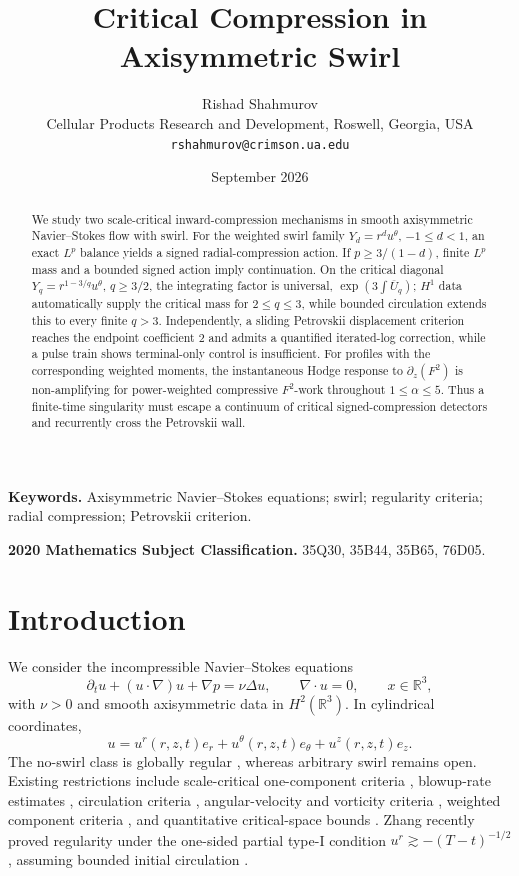 \documentclass[11pt]{article}
\title{\textbf{Critical Compression in Axisymmetric Swirl}}
\author{Rishad Shahmurov\\
Cellular Products Research and Development, Roswell, Georgia, USA\\
\texttt{rshahmurov@crimson.ua.edu}}
\date{September 2026}
\numberwithin{equation}{section}
\theoremstyle{definition}
\newcommand{\R}{\mathbb R}
\begin{document}
\maketitle

\begin{abstract}
We study two scale-critical inward-compression mechanisms in smooth axisymmetric Navier--Stokes flow with swirl.  For the weighted swirl family $Y_d=r^d u^\theta$, $-1\le d<1$, an exact $L^p$ balance yields a signed radial-compression action.  If $p\ge3/(1-d)$, finite $L^p$ mass and a bounded signed action imply continuation.  On the critical diagonal $Y_q=r^{1-3/q}u^\theta$, $q\ge3/2$, the integrating factor is universal, $\exp(3\int\overline U_q)$; $H^1$ data automatically supply the critical mass for $2\le q\le3$, while bounded circulation extends this to every finite $q>3$.  Independently, a sliding Petrovskii displacement criterion reaches the endpoint coefficient $2$ and admits a quantified iterated-log correction, while a pulse train shows terminal-only control is insufficient.  For profiles with the corresponding weighted moments, the instantaneous Hodge response to $\partial_z(F^2)$ is non-amplifying for power-weighted compressive $F^2$-work throughout $1\le\alpha\le5$.  Thus a finite-time singularity must escape a continuum of critical signed-compression detectors and recurrently cross the Petrovskii wall.
\end{abstract}

\noindent\textbf{Keywords.} Axisymmetric Navier--Stokes equations; swirl; regularity criteria; radial compression; Petrovskii criterion.

\noindent\textbf{2020 Mathematics Subject Classification.} 35Q30, 35B44, 35B65, 76D05.

\section{Introduction}

We consider the incompressible Navier--Stokes equations
\begin{equation}\label{eq:NS}
 \partial_t u+(u\cdot\nabla)u+\nabla p=\nu\Delta u,
 \qquad \nabla\cdot u=0,
 \qquad x\in\R^3,
\end{equation}
with $\nu>0$ and smooth axisymmetric data in $H^2(\R^3)$.  In cylindrical coordinates,
\[
 u=u^r(r,z,t)e_r+u^\theta(r,z,t)e_\theta+u^z(r,z,t)e_z.
\]
The no-swirl class is globally regular \cite{UkhovskiiYudovich1968,Ladyzhenskaya1968}, whereas arbitrary swirl remains open.  Existing restrictions include scale-critical one-component criteria \cite{ChaeLee2002}, blowup-rate estimates \cite{ChenStrainTsaiYau2008,ChenStrainTsaiYau2009}, circulation criteria \cite{LeiZhang2017,Wei2016}, angular-velocity and vorticity criteria \cite{ChenFangZhang2017,Zhang2016}, weighted component criteria \cite{RenclawowiczZajaczkowski2019}, and quantitative critical-space bounds \cite{OzanskiPalasek2023}.  Zhang recently proved regularity under the one-sided partial type-I condition $u^r\gtrsim-(T-t)^{-1/2}$, assuming bounded initial circulation \cite{Zhang2026}.
\end{document}
